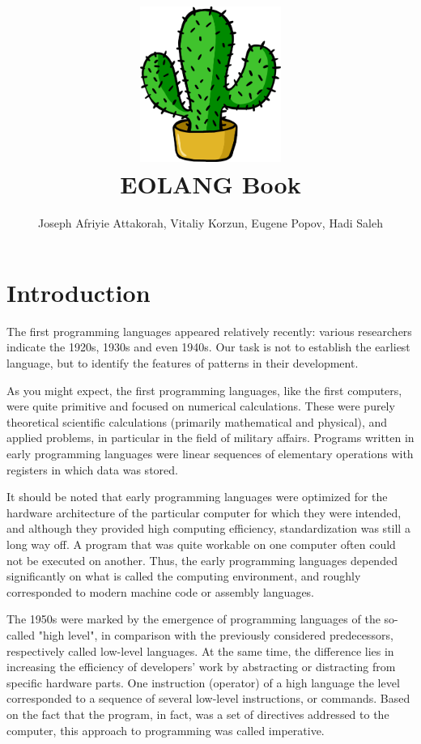 \documentclass[12pt]{book}
\title{\includegraphics[height=2in]{cactus.pdf} \\[1in] EOLANG Book}
\author{Joseph Afriyie Attakorah,
  Vitaliy Korzun,
  Eugene Popov,
  Hadi Saleh}
\begin{document}
\raggedbottom

\maketitle

\tableofcontents

\chapter{Introduction}
The first programming languages appeared relatively recently: various researchers indicate the 1920s, 1930s and even 1940s. Our task is not to establish the earliest language, but to identify the features of patterns in their development.

As you might expect, the first programming languages, like the first computers, were quite primitive and focused on numerical calculations. These were purely theoretical scientific calculations (primarily mathematical and physical), and applied problems, in particular in the field of military affairs. Programs written in early programming languages were linear sequences of elementary operations with registers in which data was stored.

It should be noted that early programming languages were optimized for the hardware architecture of the particular computer for which they were intended, and  although they provided high computing efficiency, standardization was still a long way off. A program that was quite workable on one computer often could not be executed on another. Thus, the early programming languages depended significantly on what is called the computing environment, and roughly corresponded to modern machine code or assembly languages.

The 1950s were marked by the emergence of programming languages of the so-called "high level", in comparison with the previously considered predecessors, respectively called low-level languages. At the same time, the difference lies in increasing the efficiency of developers' work by abstracting or distracting from specific hardware parts. One instruction (operator) of a high language the level corresponded to a sequence of several low-level instructions, or commands. Based on the fact that the program, in fact, was a set of directives addressed to the computer, this approach to programming was called imperative.
\end{document}
